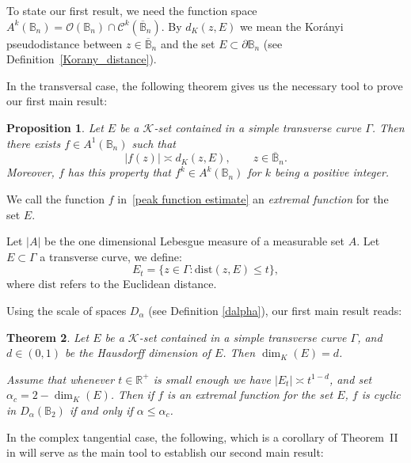 \documentclass[a4paper,12pt]{amsart}
\newtheorem{thm}{Theorem}
\newtheorem{prop}[thm]{Proposition}
\theoremstyle{definition}
\theoremstyle{remark}
\def\R{\mathbb R}
\def\B{\mathbb{B}}
\def\Bn{\mathbb{B}_n}
\begin{document}
        To state our first result, we 
need the function space $A^k(\Bn) = \mathcal{O}(\Bn) \cap \mathcal{C}^k (\overline{\B}_n)$. By $d_K(z,E)$ we mean the Korányi pseudodistance between $z \in \overline{\B}_n$ and the set $E \subset \partial \Bn$ (see Definition~\ref{Korany_distance}). 

        In the transversal case, the following theorem gives us the necessary tool to prove our first main result:

        \begin{prop}{\cite[Theorem~4.3]{Bruna1986}} \label{MainTool1}
        Let $E$ be a $\mathcal{K}$-set contained in a simple transverse curve $\Gamma$.
        Then there exists $f\in A^1(\Bn)$ such that
        \begin{equation} \label{peak function estimate}
            |f(z)| \asymp d_K(z, E), \qquad z \in \overline{\B}_n.
        \end{equation}
        Moreover, $f$ has this property that $f^k \in A^k(\Bn)$ for $k$ being a positive integer.
        \end{prop}

       We call the function $f$ in~\eqref{peak function estimate} an \emph{extremal function} for the set $E$. 
       
      Let $|A|$ be the one dimensional Lebesgue measure of a 
      measurable set $A$. Let $E\subset \Gamma$ a transverse curve, we define:
 \begin{equation} \label{eq:E_t Leb Measure}
                E_{t} = \{z \in \Gamma: \mathrm{dist}(z,E) \leq t\},
            \end{equation}
    where $\mathrm{dist}$ refers to the Euclidean distance.        
    
    Using the scale of spaces $D_\alpha$ (see
    Definition \ref{dalpha}), our first main result reads:   
        \begin{thm} \label{MainThm1}
Let $E$ be a $\mathcal{K}$-set contained in a simple transverse curve $\Gamma$, and $d \in (0,1)$ be the Hausdorff dimension of $E$. Then $\dim_{K}(E) = d$.

Assume that whenever $t \in \R^+$ is small enough we have $|E_t|  \asymp t^{1 - d}$, and set $\alpha_c = 2 - \dim_{K}(E)$.
Then if  $f$ is an extremal function for the set $E$,
$f$ is cyclic in $D_\alpha(\B_2)$ if and only if $\alpha \leq \alpha_c$.
        \end{thm}

        In the complex tangential case, the following, which is a corollary of Theorem~{II} in \cite{Bruna1986} will serve as the main tool to establish our second main result:
\end{document}
